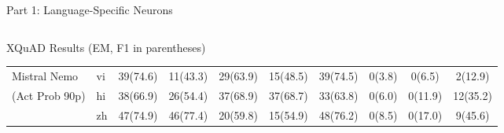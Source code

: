 \documentclass[aspectratio=169]{beamer}
\begin{document}
\begin{frame}{Part 1: Language-Specific Neurons}
\begin{columns}
\begin{column}{0.75\textwidth}
\begin{block}{\scriptsize XQuAD Results (EM, F1 in parentheses)}
\begin{tabular}{l l c c c c c c c c}
						\midrule
						Mistral Nemo & vi & 39(74.6) & 11(43.3) & 29(63.9) & 15(48.5) & 39(74.5) & 0(3.8) & 0(6.5) & 2(12.9) \\
						(Act Prob 90p) & hi & 38(66.9) & 26(54.4) & 37(68.9) & 37(68.7) & 33(63.8) & 0(6.0) & 0(11.9) & 12(35.2) \\
						& zh & 47(74.9) & 46(77.4) & 20(59.8) & 15(54.9) & 48(76.2) & 0(8.5) & 0(17.0) & 9(45.6) \\
						\bottomrule
					\end{tabular}
				\end{block}
			\end{column}
		\end{columns}
	\end{frame}
	
\end{document}
